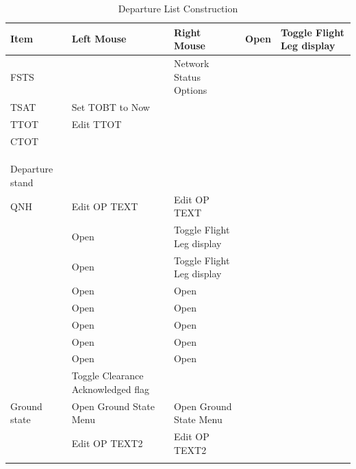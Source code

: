 \documentclass[a4paper,oneside,11pt]{memoir}
\begin{document}
\begin{longtable}{|p{}|p{}|p{}|} \hline
  \textbf{Item}                 & \textbf{Left Mouse}                 & \textbf{Right Mouse}      \endhead \hline
           & Open                & Toggle Flight Leg display \\ \hline
  FSTS                          &                                     & Network Status Options    \\ \hline
  TSAT                          & Set TOBT to Now                     &                           \\ \hline
  TTOT                          & Edit TTOT                           &                           \\ \hline
  CTOT                          &                                     &                           \\ \hline
               &                                     &                           \\ \hline
                &                                     &                           \\ \hline
                  &                                     &                           \\ \hline
  Departure stand               &                                     &                           \\ \hline
  QNH                           & Edit OP TEXT                        & Edit OP TEXT              \\ \hline
               & Open                & Toggle Flight Leg display \\ \hline
               & Open                & Toggle Flight Leg display \\ \hline
               & Open             & Open   \\ \hline
                & Open             & Open   \\ \hline
               & Open              & Open    \\ \hline
                & Open               & Open     \\ \hline
                & Open               & Open     \\ \hline
                & Toggle Clearance Acknowledged flag  &                           \\ \hline
  Ground state                  & Open Ground State Menu              & Open Ground State Menu    \\ \hline
           & Edit OP TEXT2                       & Edit OP TEXT2             \\ \hline
  \caption{Departure List Construction}
\end{longtable}
\end{document}
